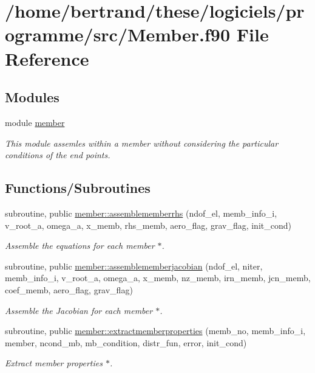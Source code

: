 \hypertarget{_member_8f90}{}\section{/home/bertrand/these/logiciels/programme/src/\+Member.f90 File Reference}
\label{_member_8f90}
\subsection*{Modules}
\begin{DoxyCompactItemize}
\item 
module \hyperlink{namespacemember}{member}
\begin{DoxyCompactList}\small\item\em This module assemles within a member without considering the particular conditions of the end points. \end{DoxyCompactList}\end{DoxyCompactItemize}
\subsection*{Functions/\+Subroutines}
\begin{DoxyCompactItemize}
\item 
subroutine, public \hyperlink{namespacemember_ac35a49c8cdb17a8b26f8c4b23d6053be}{member\+::assemblememberrhs} (ndof\+\_\+el, memb\+\_\+info\+\_\+i, v\+\_\+root\+\_\+a, omega\+\_\+a, x\+\_\+memb, rhs\+\_\+memb, aero\+\_\+flag, grav\+\_\+flag, init\+\_\+cond)
\begin{DoxyCompactList}\small\item\em Assemble the equations for each member $\ast$. \end{DoxyCompactList}\item 
subroutine, public \hyperlink{namespacemember_ad1206aacf86963bb366e5976c4f605c2}{member\+::assemblememberjacobian} (ndof\+\_\+el, niter, memb\+\_\+info\+\_\+i, v\+\_\+root\+\_\+a, omega\+\_\+a, x\+\_\+memb, nz\+\_\+memb, irn\+\_\+memb, jcn\+\_\+memb, coef\+\_\+memb, aero\+\_\+flag, grav\+\_\+flag)
\begin{DoxyCompactList}\small\item\em Assemble the Jacobian for each member $\ast$. \end{DoxyCompactList}\item 
subroutine, public \hyperlink{namespacemember_a8618a013da87b108e5e91013028fc1a8}{member\+::extractmemberproperties} (memb\+\_\+no, memb\+\_\+info\+\_\+i, member, ncond\+\_\+mb, mb\+\_\+condition, distr\+\_\+fun, error, init\+\_\+cond)
\begin{DoxyCompactList}\small\item\em Extract member properties $\ast$. \end{DoxyCompactList}\end{DoxyCompactItemize}
